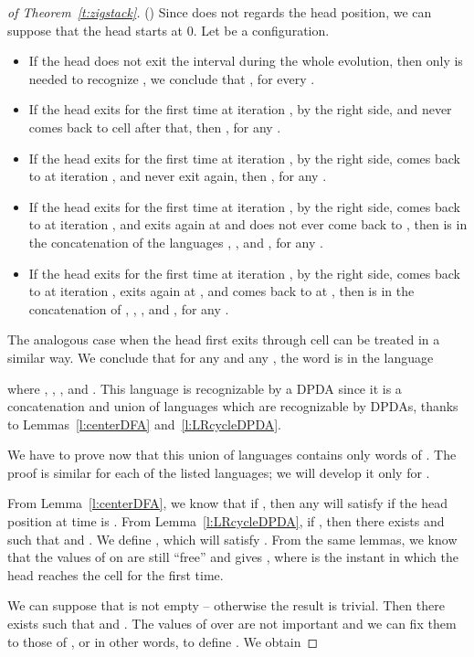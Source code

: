 \documentclass{llncs}
\begin{document}
\begin{proof}[of Theorem~\ref{t:zigstack}]

()
Since  does not regards the head position, we can suppose that the head starts at 0.
Let  be a configuration.
\begin{itemize}
\item If the head does not exit the interval  during the whole evolution, then only  is needed to recognize , we conclude that , for every .
\item If the head exits  for the first time at iteration , by the right side, and never comes back to cell  after that, then , for any .
\item If the head exits  for the first time at iteration , by the right side, comes back to  at iteration , and never exit  again, then 
, for any .
\item If the head exits  for the first time at iteration , by the right side, comes back to  at iteration , and exits  again at  and does not ever come back to , then  is in the concatenation of the languages , ,  and , for any .
\item If the head exits  for the first time at iteration , by the right side, comes back to  at iteration , exits  again at , and comes back to  at , then  is in the concatenation of , , ,  and , for any .
\end{itemize}

The analogous case when the head first exits  through cell  can be treated in a similar way. We conclude that for any  and any , the word  is in the language

where , , , and .
This language is recognizable by a DPDA since it is a concatenation and union of languages which are recognizable by DPDAs, thanks to Lemmas~\ref{l:centerDFA} and~\ref{l:LRcycleDPDA}.

We have to prove now that this union of languages contains only words of . The proof is similar for each of the listed languages; we will develop it only for
.

From Lemma~\ref{l:centerDFA}, we know that if , then any  will satisfy  if the head position at time  is .
From Lemma~\ref{l:LRcycleDPDA}, if , then there exists  and  such that  and .
We define , which will satisfy .
From the same lemmas, we know that the values of  on  are still ``free'' and  gives , where  is the instant in which the head reaches the cell  for the first time.

We can suppose that  is not empty -- otherwise the result is trivial. Then there exists  such that  and .
The values of  over  are not important and we can fix them to those of , or in other words, to define . We obtain


\end{proof}
\end{document}
